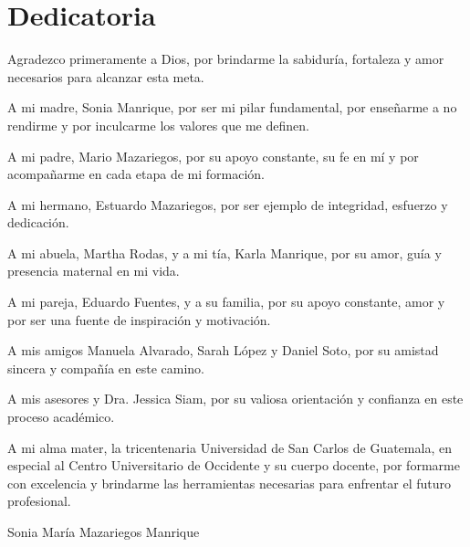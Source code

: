 \chapter*{Dedicatoria}
Agradezco primeramente a Dios, por brindarme la sabiduría, fortaleza y amor
necesarios para alcanzar esta meta.

A mi madre, Sonia Manrique, por ser mi pilar fundamental, por enseñarme a no
rendirme y por inculcarme los valores que me definen. 

A mi padre, Mario Mazariegos, por su apoyo constante, su fe en mí y por
acompañarme en cada etapa de mi formación.

A mi hermano, Estuardo Mazariegos, por ser ejemplo de integridad, esfuerzo y
dedicación. 

A mi abuela, Martha Rodas, y a mi tía, Karla Manrique, por su amor, guía y
presencia maternal en mi vida.

A mi pareja, Eduardo Fuentes, y a su familia, por su apoyo constante, amor y por
ser una fuente de inspiración y motivación.

A mis amigos Manuela Alvarado, Sarah López y Daniel Soto, por su amistad sincera
y compañía en este camino.

A mis asesores y Dra. Jessica Siam, por su valiosa orientación y confianza en
este proceso académico.

A mi alma mater, la tricentenaria Universidad de San Carlos de Guatemala, en
especial al Centro Universitario de Occidente y su cuerpo docente, por formarme
con excelencia y brindarme las herramientas necesarias para enfrentar el futuro
profesional.


\vspace{1cm}

\begin{flushright}
Sonia María Mazariegos Manrique
\end{flushright}
